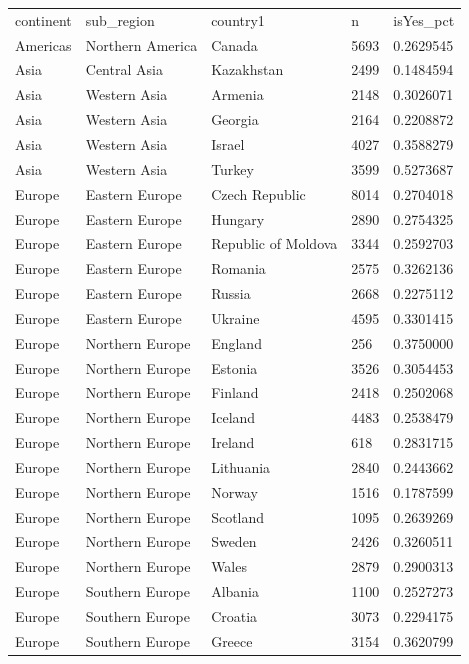 \begin{table}
\centering
\begin{tabular}{lllll}
continent & sub_region & country1 & n & isYes_pct \\
Americas & Northern America & Canada & 5693 & 0.2629545 \\
Asia & Central Asia & Kazakhstan & 2499 & 0.1484594 \\
Asia & Western Asia & Armenia & 2148 & 0.3026071 \\
Asia & Western Asia & Georgia & 2164 & 0.2208872 \\
Asia & Western Asia & Israel & 4027 & 0.3588279 \\
Asia & Western Asia & Turkey & 3599 & 0.5273687 \\
Europe & Eastern Europe & Czech Republic & 8014 & 0.2704018 \\
Europe & Eastern Europe & Hungary & 2890 & 0.2754325 \\
Europe & Eastern Europe & Republic of Moldova & 3344 & 0.2592703 \\
Europe & Eastern Europe & Romania & 2575 & 0.3262136 \\
Europe & Eastern Europe & Russia & 2668 & 0.2275112 \\
Europe & Eastern Europe & Ukraine & 4595 & 0.3301415 \\
Europe & Northern Europe & England & 256 & 0.3750000 \\
Europe & Northern Europe & Estonia & 3526 & 0.3054453 \\
Europe & Northern Europe & Finland & 2418 & 0.2502068 \\
Europe & Northern Europe & Iceland & 4483 & 0.2538479 \\
Europe & Northern Europe & Ireland & 618 & 0.2831715 \\
Europe & Northern Europe & Lithuania & 2840 & 0.2443662 \\
Europe & Northern Europe & Norway & 1516 & 0.1787599 \\
Europe & Northern Europe & Scotland & 1095 & 0.2639269 \\
Europe & Northern Europe & Sweden & 2426 & 0.3260511 \\
Europe & Northern Europe & Wales & 2879 & 0.2900313 \\
Europe & Southern Europe & Albania & 1100 & 0.2527273 \\
Europe & Southern Europe & Croatia & 3073 & 0.2294175 \\
Europe & Southern Europe & Greece & 3154 & 0.3620799 \\

\end{tabular}
\end{table}
